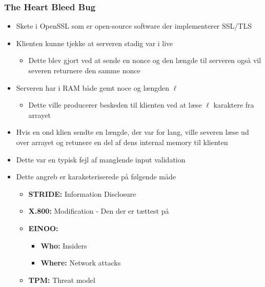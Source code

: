 \documentclass[a4, english]{article}
\begin{document}
\subsubsection{The Heart Bleed Bug}
\begin{itemize}
	\item Skete i OpenSSL som er open-source software der implementerer SSL/TLS
  \item Klienten kunne tjekke at serveren stadig var i live  
  \begin{itemize}
  	\item Dette blev gjort ved at sende en nonce og den længde til serveren også vil severen returnere den samme nonce 
  \end{itemize}
  \item Serveren har i RAM både gemt noce og længden $\ell$  
  \begin{itemize}
    \item Dette ville producerer beskeden til klienten ved at læse $\ell$ karaktere fra arrayet 
  \end{itemize}
  \item Hvis en ond klien sendte en længde, der var for lang, ville severen læse ud over arrayet og retunere en del af dens internal memory til klienten 
  \item Dette var en typisk fejl af manglende input validation 
  \item Dette angreb er karaketeriserede på følgende måde  
  \begin{itemize}
	  \item \textbf{STRIDE:} Information Disclosure 
  	\item \textbf{X.800:} Modification - Den der er tættest på 
    \item \textbf{EINOO:}
    \begin{itemize}
    	\item \textbf{Who:} Insiders
      \item \textbf{Where:} Network attacks
    \end{itemize}
	  \item \textbf{TPM:} Threat model 
  \end{itemize}
\end{itemize}
\end{document}
